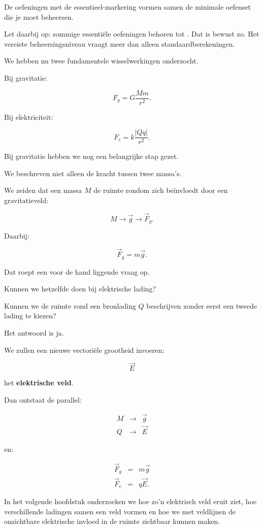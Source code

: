 \documentclass{ximera}
\begin{document}
De oefeningen met de essentieel-markering vormen samen de minimale
oefenset die je moet beheersen.

Let daarbij op: sommige essentiële oefeningen behoren tot
\oefU. Dat is bewust zo. Het vereiste beheersingsniveau vraagt meer dan
alleen standaardberekeningen.




We hebben nu twee fundamentele wisselwerkingen onderzocht.

Bij gravitatie:

\[
F_g
=
G\frac{Mm}{r^2}.
\]

Bij elektriciteit:

\[
F_e
=
k\frac{|Qq|}{r^2}.
\]

Bij gravitatie hebben we nog een belangrijke stap gezet.

We beschreven niet alleen de kracht tussen twee massa's.

We zeiden dat een massa $M$ de ruimte rondom zich beïnvloedt door een
gravitatieveld:

\[
M
\longrightarrow
\vec g
\longrightarrow
\vec F_g.
\]

Daarbij:

\[
\vec F_g=m\vec g.
\]

Dat roept een voor de hand liggende vraag op.

Kunnen we hetzelfde doen bij elektrische lading?

Kunnen we de ruimte rond een bronlading $Q$ beschrijven zonder eerst
een tweede lading te kiezen?

Het antwoord is ja.

We zullen een nieuwe vectoriële grootheid invoeren:

\[
\boxed{\vec E}
\]

het \textbf{elektrische veld}.

Dan ontstaat de parallel:

\[
\boxed{
\begin{array}{ccc}
M & \longrightarrow & \vec g
\\
Q & \longrightarrow & \vec E
\end{array}
}
\]

en:

\[
\boxed{
\begin{array}{ccc}
\vec F_g &=&m\vec g
\\[1mm]
\vec F_e&=&q\vec E.
\end{array}
}
\]

In het volgende hoofdstuk onderzoeken we hoe zo'n elektrisch veld eruit
ziet, hoe verschillende ladingen samen een veld vormen en hoe we met
veldlijnen de onzichtbare elektrische invloed in de ruimte zichtbaar
kunnen maken.
\end{document}
